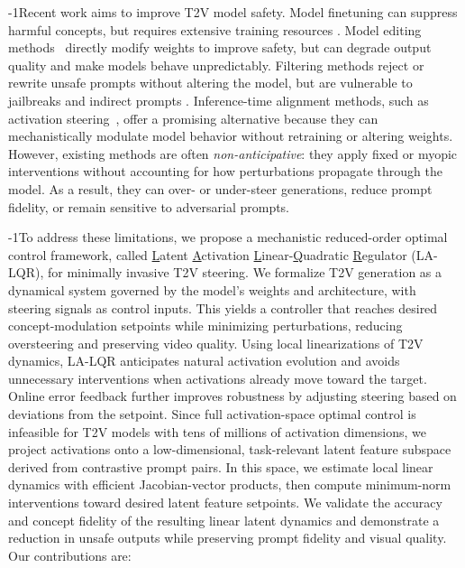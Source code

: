\documentclass{article}
\begin{document}
\looseness-1Recent work aims to improve T2V model safety. Model finetuning can suppress harmful concepts, but requires extensive training resources \cite{cheng2025vpo, dai2024safesora}. Model editing methods~\cite{gandikota2024unified} directly modify weights to improve safety, but can degrade output quality and make models behave unpredictably. Filtering methods reject or rewrite unsafe prompts without altering the model, but are vulnerable to jailbreaks and indirect prompts \cite{yoon2024safree}. Inference-time alignment methods, such as activation steering~\cite{turner2024activation, ode_activation_steering, skifstad2026local}, offer a promising alternative because they can mechanistically modulate model behavior without retraining or altering weights. However, existing methods are often \textit{non-anticipative}: they apply fixed or myopic interventions without accounting for how perturbations propagate through the model. As a result, they can over- or under-steer generations, reduce prompt fidelity, or remain sensitive to adversarial prompts.

\looseness-1To address these limitations, we propose a mechanistic reduced-order optimal control framework, called \underline{L}atent \underline{A}ctivation \underline{L}inear-\underline{Q}uadratic \underline{R}egulator (LA-LQR), for minimally invasive T2V steering. We formalize T2V generation as a dynamical system governed by the model’s weights and architecture, with steering signals as control inputs. This yields a controller that reaches desired concept-modulation setpoints while minimizing perturbations, reducing oversteering and preserving video quality. Using local linearizations of T2V dynamics, LA-LQR anticipates natural activation evolution and avoids unnecessary interventions when activations already move toward the target. Online error feedback further improves robustness by adjusting steering based on deviations from the setpoint. Since full activation-space optimal control is infeasible for T2V models with tens of millions of activation dimensions, we project activations onto a low-dimensional, task-relevant latent feature subspace derived from contrastive prompt pairs. In this space, we estimate local linear dynamics with efficient Jacobian-vector products, then compute minimum-norm interventions toward desired latent feature setpoints. We validate the accuracy and concept fidelity of the resulting linear latent dynamics and demonstrate a reduction in unsafe outputs while preserving prompt fidelity and visual quality. Our contributions are:
\vspace{-7pt}
\end{document}
